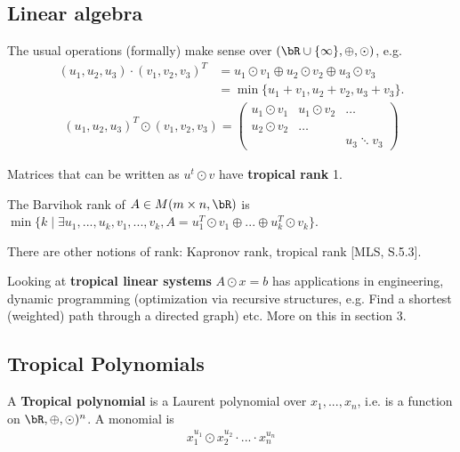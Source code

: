 \subsection{Linear algebra} The usual operations (formally) make sense over $(\bR\cup \{\infty\}, \oplus,\odot)$, e.g.
\begin{align*}
  (u_1,u_2,u_3)\cdot (v_1,v_2,v_3)^T &= u_1\odot v_1 \oplus u_2\odot v_2 \oplus u_3\odot v_3 \\
                                     &= \min\{u_1+v_1,u_2+v_2,u_3+v_3\}.
\end{align*}
\begin{align*}
  (u_1,u_2,u_3)^T\odot (v_1,v_2,v_3) = 
  \begin{pmatrix}
    u_1\odot v_1 & u_1 \odot v_2 & \hdots \\
    u_2\odot v_2 & \hdots & \\
                 & & u_3\ddots v_3
  \end{pmatrix}
\end{align*}
\begin{defn}\label{defn:tropical-rank}
  Matrices that can be written as $u^t \odot v$ have \textbf{tropical rank} 1.
\end{defn}
\begin{defn}\label{defn:barvihok-rank}
  The Barvihok rank of $A \in M(m\times n, \bR)$ is $\min\{k \mid \exists u_1,...,u_k, v_1,...,v_k, A = u_1^T\odot v_1\oplus...\oplus u_k^T\odot v_k\}$.
\end{defn}
There are other notions of rank: Kapronov rank, tropical rank [MLS, S.5.3].

Looking at \textbf{tropical linear systems} $A\odot x = b$ has applications in engineering, dynamic programming (optimization via recursive structures, e.g. Find a shortest (weighted) path through a directed graph) etc. More on this in section 3.

\subsection{Tropical Polynomials}
\begin{defn}\label{defn:tropical-polynomials}
  A \textbf{Tropical polynomial} is a Laurent polynomial over $x_1,...,x_n$, i.e. is a function on $\bR,\oplus,\odot)^n$. A monomial is 
  \begin{align*}
    x_1^{u_1}\odot x_2^{u_2} \cdot ... \cdot x_n^{u_n}
  \end{align*}
\end{defn}
\printbibliography

